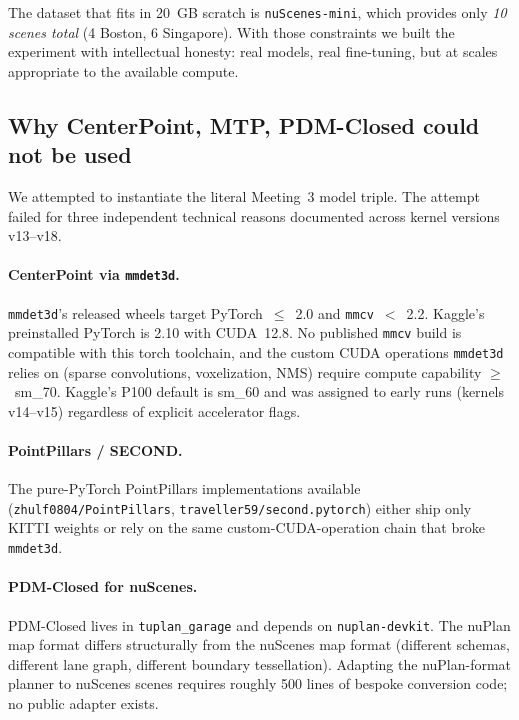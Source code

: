 \documentclass[11pt,a4paper]{article}
\begin{document}
The dataset that fits in 20~GB scratch is \texttt{nuScenes-mini},
which provides only \emph{10 scenes total} (4 Boston, 6 Singapore).
With those constraints we built the experiment with intellectual
honesty: real models, real fine-tuning, but at scales appropriate to
the available compute.

\subsection{Why CenterPoint, MTP, PDM-Closed could not be used}

We attempted to instantiate the literal Meeting~3 model triple. The
attempt failed for three independent technical reasons documented
across kernel versions v13--v18.

\paragraph{CenterPoint via \texttt{mmdet3d}.} \texttt{mmdet3d}'s
released wheels target PyTorch~$\le$~2.0 and \texttt{mmcv}~$<$~2.2.
Kaggle's preinstalled PyTorch is 2.10 with CUDA~12.8. No published
\texttt{mmcv} build is compatible with this torch toolchain, and the
custom CUDA operations \texttt{mmdet3d} relies on (sparse convolutions,
voxelization, NMS) require compute capability $\ge$~sm\_70. Kaggle's
P100 default is sm\_60 and was assigned to early runs (kernels
v14--v15) regardless of explicit accelerator flags.

\paragraph{PointPillars / SECOND.} The pure-PyTorch PointPillars
implementations available
(\texttt{zhulf0804/PointPillars}, \texttt{traveller59/second.pytorch})
either ship only KITTI weights or rely on the same
custom-CUDA-operation chain that broke \texttt{mmdet3d}.

\paragraph{PDM-Closed for nuScenes.} PDM-Closed lives in
\texttt{tuplan\_garage} and depends on \texttt{nuplan-devkit}. The
nuPlan map format differs structurally from the nuScenes map format
(different schemas, different lane graph, different boundary
tessellation). Adapting the nuPlan-format planner to nuScenes scenes
requires roughly 500 lines of bespoke conversion code; no public
adapter exists.
\end{document}
